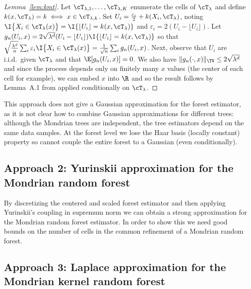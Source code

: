 \documentclass{article}
\begin{document}
\begin{proof}[Lemma~\ref{lem:kmt}]

  Let $\cT_{\lambda,1}, \ldots, \cT_{\lambda,K}$
  enumerate the cells of $\cT_\lambda$
  and define $k(x, \cT_\lambda) = k \iff x \in \cT_{\lambda,k}$.
  Set
  $U_i = \frac{\varepsilon_i}{2}
  + k(X_i, \cT_\lambda)$,
  noting
  $\I\big\{ X_i \in \cT_\lambda(x) \big\}
  = \I\{\lfloor U_i \rfloor = k(x, \cT_\lambda)\}$
  and
  $\varepsilon_i = 2(U_i - \lfloor U_i \rfloor)$.
  Let
  $g_n(U_i, x) = 2 \sqrt{\lambda^d} (U_i - \lfloor U_i \rfloor)
  \I\{\lfloor U_i \rfloor = k(x, \cT_\lambda)\}$
  so that
  $ \sqrt{\frac{\lambda^d}{n}}
  \sum_i \varepsilon_i \I\big\{ X_i \in \cT_\lambda(x) \big\}
  = \frac{1}{\sqrt n} \sum_i g_n(U_i,x)$.
  Next, observe that
  $U_i$ are i.i.d.\ given $\cT_\lambda$ and that
  $\E[g_n(U_i, x)] = 0$.
  We also have
  $\|g_n(\cdot, x)\|_\TV \leq 2 \sqrt{\lambda^d}$
  and since the process depends only on finitely many $x$ values
  (the center of each cell for example),
  we can embed $x$ into $\R$ and
  so the result follows by Lemma~A.1 from
  \cite{cattaneo2022uniform}
  applied conditionally on $\cT_\lambda$.
\end{proof}


This approach does not give a Gaussian approximation
for the forest estimator,
as it is not clear how to combine Gaussian approximations
for different trees:
although the Mondrian trees are independent,
the tree estimators depend on the same data samples.
At the forest level we lose the Haar basis
(locally constant) property
so cannot couple the entire forest to a Gaussian
(even conditionally).

\subsection{Approach 2: Yurinskii approximation
  for the Mondrian random forest}

By discretizing the centered and scaled forest estimator
and then applying Yurinskii's coupling in supremum norm
\cite{belloni2019conditional}
we can obtain a strong approximation for the
Mondrian random forest estimator.
In order to show this we need good bounds on the
number of cells in the common refinement of a Mondrian
random forest.



\subsection{Approach 3: Laplace approximation
  for the Mondrian kernel random forest}
\end{document}
